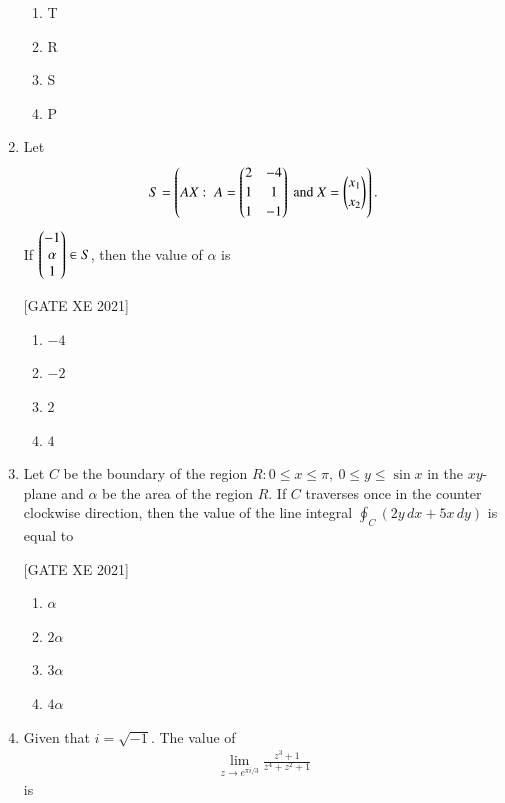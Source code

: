 \documentclass[journal,12pt,onecolumn]{IEEEtran}
\theoremstyle{remark}
\begin{document}
\begin{enumerate}
  \begin{multicols}{2}
  \begin{enumerate}
    \item T
    \item R
    \item S
    \item P
  \end{enumerate}
  \end{multicols}
\item Let
\begin{align}
    S=\brak{AX:\; A=\myvec{2&-4\\[2pt]1&1\\[2pt]1&-1}\ \text{and}\ X=\myvec{x_1\\[2pt]x_2}}.
\end{align}
If \(\begin{pmatrix}-1\\ \alpha\\ 1\end{pmatrix}\in S\), then the value of \(\alpha\) is

\hfill[GATE XE 2021]

\begin{multicols}{2}
\begin{enumerate}
\item $-4$
\item $-2$
\item $2$
\item $4$
\end{enumerate}
\end{multicols}


\item Let \(C\) be the boundary of the region \(R: 0\le x\le \pi,\ 0\le y\le \sin x\) in the \(xy\)-plane and \(\alpha\) be the area of the region \(R\). If \(C\) traverses once in the counter clockwise direction, then the value of the line integral \(\displaystyle \oint_C (2y\,dx+5x\,dy)\) is equal to

\hfill[GATE XE 2021]

\begin{multicols}{2}
\begin{enumerate}
\item \(\alpha\)
\item \(2\alpha\)
\item \(3\alpha\)
\item \(4\alpha\)
\end{enumerate}
\end{multicols}


\item Given that \(i=\sqrt{-1}\). The value of
\begin{align}
    \lim_{z\to e^{\pi i/3}}\frac{z^{3}+1}{z^{4}+z^{2}+1}
\end{align}
is


\end{enumerate}
\end{document}
